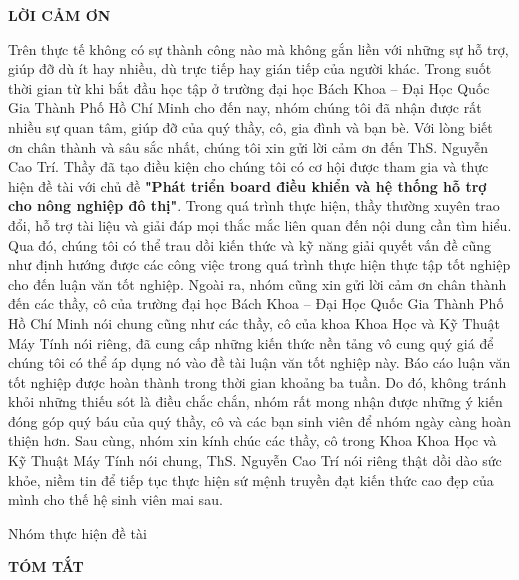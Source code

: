 \documentclass[a4paper,12pt,oneside]{article}
\begin{document}
\newpage
\begin{center}
{\fontsize{20pt}{1}\selectfont \textbf{LỜI CẢM ƠN}}\\[1cm]
\end{center}
Trên thực tế không có sự thành công nào mà không gắn liền với những sự hỗ trợ, giúp
đỡ dù ít hay nhiều, dù trực tiếp hay gián tiếp của người khác. Trong suốt thời gian từ
khi bắt đầu học tập ở trường đại học Bách Khoa – Đại Học Quốc Gia Thành Phố Hồ
Chí Minh cho đến nay, nhóm chúng tôi đã nhận được rất nhiều sự quan tâm, giúp đỡ
của quý thầy, cô, gia đình và bạn bè.
Với lòng biết ơn chân thành và sâu sắc nhất, chúng tôi xin gửi lời cảm ơn đến ThS. Nguyễn Cao Trí. Thầy đã tạo điều kiện cho chúng tôi có cơ hội được tham gia và thực hiện
đề tài với chủ đề \textbf{"Phát triển board điều khiển và hệ thống hỗ trợ cho nông nghiệp đô thị"}. Trong quá trình thực hiện, thầy thường xuyên trao đổi, hỗ
trợ tài liệu và giải đáp mọi thắc mắc liên quan đến nội dung cần tìm hiểu. Qua đó, chúng
tôi có thể trau dồi kiến thức và kỹ năng giải quyết vấn đề cũng như định hướng được
các công việc trong quá trình thực hiện thực tập tốt nghiệp cho đến luận văn tốt nghiệp.
Ngoài ra, nhóm cũng xin gửi lời cảm ơn chân thành đến các thầy, cô của trường
đại học Bách Khoa – Đại Học Quốc Gia Thành Phố Hồ Chí Minh nói chung cũng như
các thầy, cô của khoa Khoa Học và Kỹ Thuật Máy Tính nói riêng, đã cung cấp những
kiến thức nền tảng vô cung quý giá để chúng tôi có thể áp dụng nó vào đề tài luận
văn tốt nghiệp này.
Báo cáo luận văn tốt nghiệp được hoàn thành trong thời gian khoảng ba tuần. Do đó,
không tránh khỏi những thiếu sót là điều chắc chắn, nhóm rất mong nhận được những
ý kiến đóng góp quý báu của quý thầy, cô và các bạn sinh viên để nhóm ngày càng
hoàn thiện hơn.
Sau cùng, nhóm xin kính chúc các thầy, cô trong Khoa Khoa Học và Kỹ Thuật
Máy Tính nói chung, ThS. Nguyễn Cao Trí nói riêng thật dồi dào sức khỏe, niềm tin
để tiếp tục thực hiện sứ mệnh truyền đạt kiến thức cao đẹp của mình cho thế hệ sinh
viên mai sau.
\begin{flushright}
Nhóm thực hiện đề tài
\end{flushright}
\newpage
\begin{center}
{\fontsize{20pt}{1}\selectfont \textbf{TÓM TẮT}}\\[1cm]
\end{center}
\end{document}
